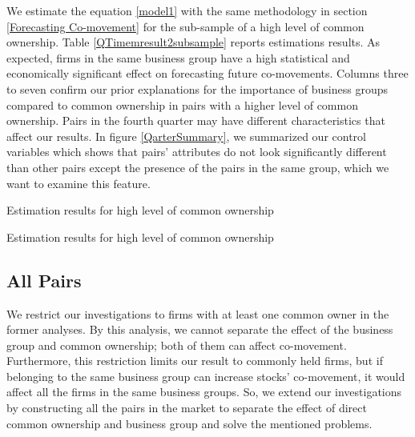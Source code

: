 			
	
	We estimate the equation \ref{model1} with the same methodology in section \ref{Forecasting Co-movement}  for the sub-sample of a high level of common ownership. Table \ref{QTimemresult2subsample} reports estimations results. As expected, firms in the same business group have a high statistical and economically significant effect on forecasting future co-movements. Columns three to seven confirm our prior explanations for the importance of business groups compared to common ownership in pairs with a higher level of common ownership. Pairs in the fourth quarter may have different characteristics that affect our results.  In figure \ref{QarterSummary}, we summarized our control variables which shows that pairs' attributes do not look significantly different than other pairs except the presence of the pairs in the same group, which we want to examine this feature.
	
			{\begin{table}[htbp]
					\centering
					\caption{\scriptsize Estimation results for high level of common ownership}
					\label{QTimemresult2subsample}
					{
						\resizebox{\textwidth}{!}{
						
						}
					}
			\end{table}}
			
		
\begin{table}
\centering
					\caption{\scriptsize Estimation results for high level of common ownership}
					\label{QarterSummary}
	

\end{table}
				
				
				\FloatBarrier
				
				\subsection{All Pairs}
				
We restrict our investigations to firms with at least one common owner in the former analyses. By this analysis, we cannot separate the effect of the business group and common ownership; both of them can affect co-movement. Furthermore, this restriction limits our result to commonly held firms, but if belonging to the same business group can increase stocks' co-movement, it would affect all the firms in the same business groups. 	So, we extend our investigations by constructing all the pairs in the market to separate the effect of direct common ownership and business group and solve the mentioned problems. 
	
